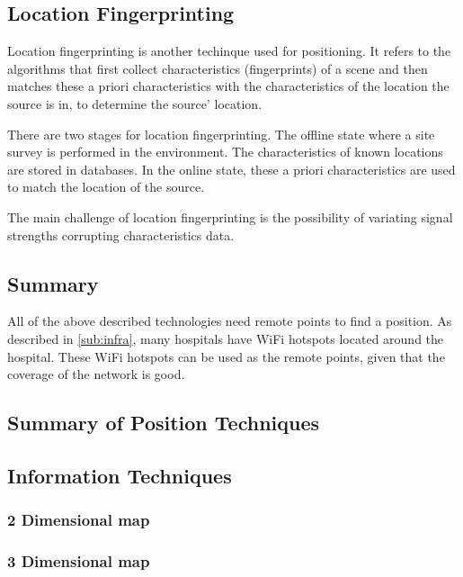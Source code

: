   


  

  \subsection{Location Fingerprinting}


  Location fingerprinting is another techinque used for positioning. It refers to the algorithms that first collect characteristics (fingerprints) of a scene and then matches these a priori characteristics with the characteristics of the location the source is in, to determine the source' location.

  There are two stages for location fingerprinting. The offline state where a site survey is performed in the environment. The characteristics of known locations are stored in databases. In the online state, these a priori characteristics are used to match the location of the source.

  The main challenge of location fingerprinting is the possibility of variating signal strengths corrupting characteristics data.

  \subsection{Summary}


  All of the above described technologies need remote points to find a position. As described in \cref{sub:infra}, many hospitals have WiFi hotspots located around the hospital. These WiFi hotspots can be used as the remote points, given that the coverage of the network is good.

  \subsection{Summary of Position Techniques}

  \subsection{Information Techniques}

  \subsubsection{2 Dimensional map}

  \subsubsection{3 Dimensional map}

